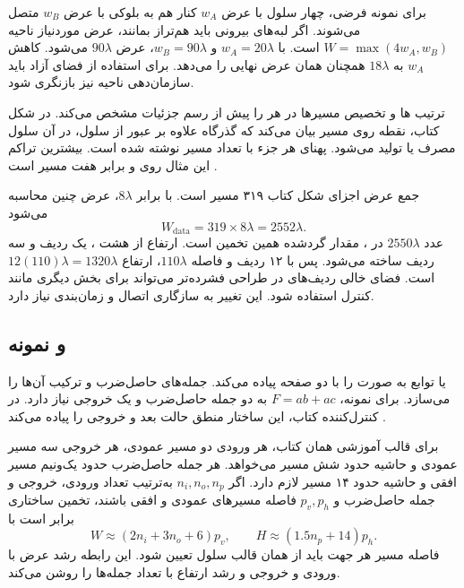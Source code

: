 برای نمونه فرضی، چهار سلول با عرض \(w_A\) کنار هم به بلوکی با عرض \(w_B\)
متصل می‌شوند. اگر لبه‌های بیرونی باید هم‌تراز بمانند، عرض موردنیاز ناحیه
\(W=\max(4w_A,w_B)\) است. با \(w_A=20\lambda\) و \(w_B=90\lambda\)،
عرض \(90\lambda\) می‌شود. کاهش \(w_A\) به \(18\lambda\) همچنان همان عرض
نهایی را می‌دهد. برای استفاده از فضای آزاد باید سازمان‌دهی ناحیه نیز بازنگری شود.

 ترتیب ها و تخصیص مسیرها در هر  را
پیش از رسم جزئیات مشخص می‌کند. در شکل  کتاب، نقطه روی مسیر بیان می‌کند
که گذرگاه علاوه بر عبور از سلول، در آن سلول مصرف یا تولید می‌شود. پهنای هر جزء با
تعداد مسیر نوشته شده است. بیشترین تراکم این مثال روی  و برابر
هفت مسیر است \cite[بخش ]{weste}.

جمع عرض اجزای شکل کتاب ۳۱۹ مسیر است. با  برابر \(8\lambda\)،
عرض  چنین محاسبه می‌شود
\begin{equation*}
 W_{\mathrm{data}}=319\times8\lambda=2552\lambda.
\end{equation*}
عدد \(2550\lambda\) در ، مقدار گرد‌شده همین تخمین است.
ارتفاع از هشت ، یک ردیف  و سه ردیف 
ساخته می‌شود. پس با ۱۲ ردیف و فاصله \(110\lambda\)، ارتفاع
\(12(110)\lambda=1320\lambda\) است. فضای خالی ردیف‌های  در طراحی
فشرده‌تر می‌تواند برای بخش دیگری مانند کنترل استفاده شود. این تغییر به سازگاری
اتصال و زمان‌بندی نیاز دارد.

\subsection{ و نمونه }
 یا  توابع به صورت 
را با دو صفحه پیاده می‌کند.  جمله‌های حاصل‌ضرب و 
ترکیب آن‌ها را می‌سازد. برای نمونه، \(F=ab+ac\) به دو جمله حاصل‌ضرب و یک خروجی
نیاز دارد. در کنترل‌کننده کتاب، این ساختار منطق حالت بعد و خروجی  را
پیاده می‌کند \cite[بخش ، شکل ]{weste}.

برای قالب آموزشی همان کتاب، هر ورودی دو مسیر عمودی، هر خروجی سه مسیر عمودی و
حاشیه حدود شش مسیر می‌خواهد. هر جمله حاصل‌ضرب حدود یک‌ونیم مسیر افقی و حاشیه
حدود ۱۴ مسیر لازم دارد. اگر \(n_i,n_o,n_p\) به‌ترتیب تعداد ورودی، خروجی و جمله
حاصل‌ضرب و \(p_v,p_h\) فاصله مسیرهای عمودی و افقی باشند، تخمین ساختاری برابر است با
\begin{equation}
 W\approx(2n_i+3n_o+6)p_v,\qquad
 H\approx(1.5n_p+14)p_h.
 \label{eq:impl-pla-estimate}
\end{equation}
فاصله مسیر هر جهت باید از همان قالب سلول تعیین شود. این رابطه رشد عرض با ورودی
و خروجی و رشد ارتفاع با تعداد جمله‌ها را روشن می‌کند.


